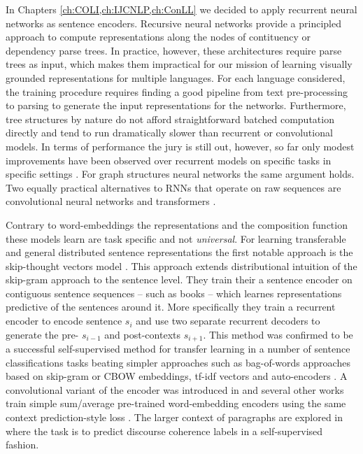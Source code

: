 In Chapters \ref{ch:COLI,ch:IJCNLP,ch:ConLL} we decided to apply
recurrent neural networks as sentence encoders.
Recursive neural networks provide a principled approach to
compute representations along the nodes of contituency
\cite{socher2013recursive} or dependency \cite{socher2014grounded} parse trees.
In practice, however, these architectures require parse trees as input,
which makes them impractical for our mission of learning visually grounded
representations for multiple languages.
For each language considered, the training procedure requires finding a good
pipeline from text pre-processing to parsing to generate the input representations
for the networks. Furthermore, tree structures by nature do not
afford straightforward batched computation directly and tend to run dramatically
slower than recurrent or convolutional models. In terms of performance the jury
is still out, however, so far only modest improvements have been observed
over recurrent models on specific tasks in specific settings
\cite{li2015tree,tai2015improved}. For graph structures neural networks the
same argument holds. Two equally practical alternatives to RNNs
that operate on raw sequences are convolutional neural networks
\cite{bai2018empirical} and transformers \cite{vaswani2017attention}.


Contrary to word-embeddings the representations
and the composition function these models learn are task specific and not \emph{universal}.
For learning transferable and general distributed sentence representations the first notable approach is the
skip-thought vectors model \cite{kiros2015skip}.
This approach extends distributional intuition of the skip-gram approach to the sentence level.
They train their a sentence encoder on contiguous sentence sequences
-- such as books -- which learnes representations predictive of the sentences around it.
More specifically
they train a recurrent encoder to encode sentence $s_i$ and use two separate recurrent decoders to
generate the pre- $s_{i-1}$ and post-contexts $s_{i+1}$.
This method was confirmed to be a successful self-supervised method for transfer
learning in a number of sentence
classifications tasks beating simpler approaches such as bag-of-words approaches based on skip-gram
or CBOW embeddings, tf-idf vectors and auto-encoders \cite{hill2016learning}. A convolutional
variant of the encoder was introduced in \cite{gan2016unsupervised} and several other works
train simple sum/average pre-trained word-embedding encoders using the same context prediction-style
loss \cite{kenter2016siamese,hill2016learning}. The larger context of paragraphs are
explored in \cite{jernite2017discourse} where the task is to predict discourse coherence
labels in a self-supervised fashion.

